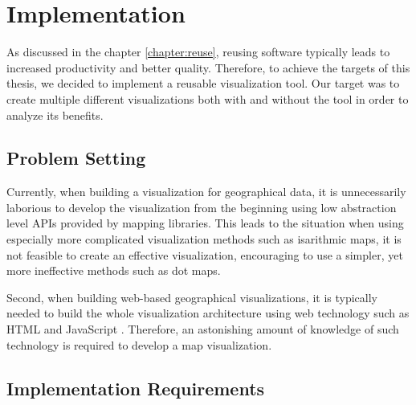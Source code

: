 
\chapter{Implementation}
\label{chapter:implementation}




As discussed in the chapter \ref{chapter:reuse}, reusing software typically leads to increased productivity and better quality. Therefore, to achieve the targets of this thesis, we decided to implement a reusable visualization tool. Our target was to create multiple different visualizations both with and without the tool in order to analyze its benefits.

\section{Problem Setting}

Currently, when building a visualization for geographical data, it is unnecessarily laborious to develop the visualization from the beginning using low abstraction level APIs provided by mapping libraries. This leads to the situation when using especially more complicated visualization methods such as isarithmic maps, it is not feasible to create an effective visualization, encouraging to use a simpler, yet more ineffective methods such as dot maps.

Second, when building web-based geographical visualizations, it is typically needed to build the whole visualization architecture using web technology such as HTML \citep{world_wide_web_consortium_html5_2014} and JavaScript \citep{ecma_ecmascript_2011}. Therefore, an astonishing amount of knowledge of such technology is required to develop a map visualization. 


\section{Implementation Requirements}

